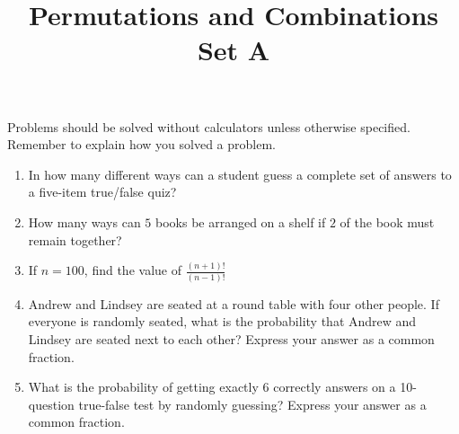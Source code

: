 \documentclass{article}
\title{Permutations and Combinations Set A}
\author{}
\date{}
\begin{document}
    \maketitle
    \noindent Problems should be solved without calculators unless otherwise specified.
    Remember to explain how you solved a problem.
    \begin{enumerate}
        \item In how many different ways can a student guess a complete set of answers to a
        five-item true/false quiz?
        \vspace{3cm}
        \item How many ways can $5$ books be arranged on a shelf if $2$ of the book must
        remain together?
        \vspace{3cm}
        \item If $n = 100$, find the value of $\frac{(n+1)!}{(n-1)!}$
        \pagebreak
        \item Andrew and Lindsey are seated at a round table with four other people. If everyone
        is randomly seated, what is the probability that Andrew and Lindsey are seated next to
        each other? Express your answer as a common fraction.
        \vspace{3cm}
        \item What is the probability of getting exactly $6$ correctly answers on a 10-question
        true-false test by randomly guessing? Express your answer as a common fraction.
        \vspace{3cm}
    \end{enumerate}
\end{document}
